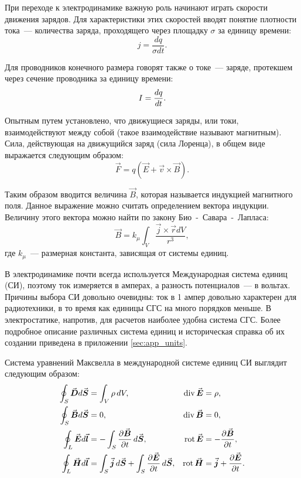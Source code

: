 При переходе к электродинамике важную роль начинают играть скорости движения зарядов. Для характеристики этих скоростей вводят понятие плотности тока~--- количества заряда, проходящего через площадку $\sigma$ за единицу времени:
\begin{equation}
	j = \frac{dq}{\sigma dt}.
\end{equation}

Для проводников конечного размера говорят также о токе~--- заряде, протекшем через сечение проводника за единицу времени:
\begin{equation}
	\eqmark{current}
	I = \frac{dq}{dt}.
\end{equation}

Опытным путем установлено, что движущиеся заряды, или токи, взаимодействуют между собой (такое взаимодействие называют магнитным). Сила, действующая на движущийся заряд (сила Лоренца), в общем виде выражается следующим образом:
\begin{equation}
	\vec{F} = q \left( \vec{E} + \vec{v} \times \vec{B} \right).
\end{equation}

Таким образом вводится величина $\vec{B}$, которая называется индукцией магнитного поля. Данное выражение можно считать определением вектора индукции. Величину этого вектора можно найти по закону Био~-~Савара~-~Лапласа:
\begin{equation}
	\vec{B} = k_{\mu}\int_{V}{\frac{\vec{j} \times \vec{r} dV}{r^3}},
\end{equation}
где $k_{\mu}$~--- размерная константа, зависящая от системы единиц.


В электродинамике почти всегда используется Международная система единиц (СИ), поэтому ток измеряется в амперах, а разность потенциалов~--- в вольтах. Причины выбора СИ довольно очевидны: ток в 1 ампер довольно характерен для радиотехники, в то время как единицы СГС на много порядков меньше. В электростатике, напротив, для расчетов наиболее удобна система СГС. Более подробное описание различных система единиц и историческая справка об их создании приведена в приложении \ref{sec:app_units}.

Система уравнений Максвелла в международной системе единиц СИ выглядит следующим образом:
\begin{gather}
	\eqmark{maxwell-si}
	\begin{aligned}
		\oint_S\vec{D}d\vec{S} &= \int_V\rho\,dV, 																	& \Div\vec{E} 				&= \rho,												\\
		\oint_S\vec{B}d\vec{S} &= 0, 																				& \Div\vec{B}				&= 0,													\\
		\oint_L\vec{E}d\vec{l} &= -\int_S\frac{\partial{\vec{B}}} {\partial t}\,d\vec{S}, 							& \Rot\vec{E} 	   			&= -\frac{\partial\vec B}{\partial t},					\\
		\oint_L\vec{H}d\vec{l} &= \int_S\vec{j}\,d\vec{S} + \int_S\frac{\partial{\vec{E}}}{\partial t}\,d\vec{S}, 	& \Rot\vec{H} 				&= \vec{j} + \frac{\partial\vec E}{\partial t}.
	\end{aligned}
\end{gather}


